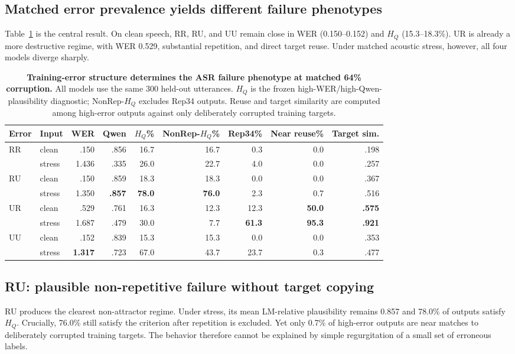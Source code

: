 \documentclass[conference]{IEEEtran}
\begin{document}
\subsection{Matched error prevalence yields different failure phenotypes}
Table~\ref{tab:riskmap64} is the central result. On clean speech, RR, RU, and UU
remain close in WER (0.150--0.152) and $H_Q$ (15.3--18.3\%). UR is already a
more destructive regime, with WER 0.529, substantial repetition, and direct
target reuse. Under matched acoustic stress, however, all four models diverge
sharply.

\begin{table}[t]
\centering
\caption{\textbf{Training-error structure determines the ASR failure phenotype
at matched 64\% corruption.} All models use the same 300 held-out utterances.
$H_Q$ is the frozen high-WER/high-Qwen-plausibility diagnostic; NonRep-$H_Q$
excludes Rep34 outputs. Reuse and target similarity are computed among high-error
outputs against only deliberately corrupted training targets.}
\label{tab:riskmap64}
\scriptsize
\setlength{\tabcolsep}{3.0pt}
\begin{tabular}{llrrrrrrr}
\toprule
Error & Input & WER & Qwen & $H_Q$\% & NonRep-$H_Q$\% & Rep34\% & Near reuse\% & Target sim. \\
\midrule
RR & clean  & .150 & .856 & 16.7 & 16.7 & 0.3 & 0.0 & .198 \\
   & stress & 1.436 & .335 & 26.0 & 22.7 & 4.0 & 0.0 & .257 \\
\midrule
RU & clean  & .150 & .859 & 18.3 & 18.3 & 0.0 & 0.0 & .367 \\
   & stress & 1.350 & \textbf{.857} & \textbf{78.0} & \textbf{76.0} & 2.3 & 0.7 & .516 \\
\midrule
UR & clean  & .529 & .761 & 16.3 & 12.3 & 12.3 & \textbf{50.0} & \textbf{.575} \\
   & stress & 1.687 & .479 & 30.0 & 7.7 & \textbf{61.3} & \textbf{95.3} & \textbf{.921} \\
\midrule
UU & clean  & .152 & .839 & 15.3 & 15.3 & 0.0 & 0.0 & .353 \\
   & stress & \textbf{1.317} & .723 & 67.0 & 43.7 & 23.7 & 0.3 & .477 \\
\bottomrule
\end{tabular}
\end{table}

\subsection{RU: plausible non-repetitive failure without target copying}
RU produces the clearest non-attractor regime. Under stress, its mean
LM-relative plausibility remains 0.857 and 78.0\% of outputs satisfy $H_Q$.
Crucially, 76.0\% still satisfy the criterion after repetition is excluded. Yet
only 0.7\% of high-error outputs are near matches to deliberately corrupted
training targets. The behavior therefore cannot be explained by simple
regurgitation of a small set of erroneous labels.
\end{document}
